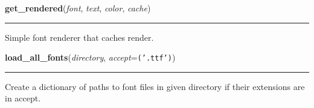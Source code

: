     \label{pygame-asteroids:tools:get_rendered}

    \vspace{0.5ex}

\hspace{.8\funcindent}\begin{boxedminipage}{\funcwidth}

    \raggedright \textbf{get\_rendered}(\textit{font}, \textit{text}, \textit{color}, \textit{cache})

    \vspace{-1.5ex}

    \rule{\textwidth}{0.5\fboxrule}
\setlength{\parskip}{2ex}
    Simple font renderer that caches render.

\setlength{\parskip}{1ex}
    \end{boxedminipage}

    \label{pygame-asteroids:tools:load_all_fonts}

    \vspace{0.5ex}

\hspace{.8\funcindent}\begin{boxedminipage}{\funcwidth}

    \raggedright \textbf{load\_all\_fonts}(\textit{directory}, \textit{accept}={\tt \texttt{(}\texttt{'}\texttt{.ttf}\texttt{'}\texttt{)}})

    \vspace{-1.5ex}

    \rule{\textwidth}{0.5\fboxrule}
\setlength{\parskip}{2ex}
    Create a dictionary of paths to font files in given directory if their 
    extensions are in accept.

\setlength{\parskip}{1ex}
    \end{boxedminipage}

    \label{pygame-asteroids:tools:load_all_gfx}

    \vspace{0.5ex}

